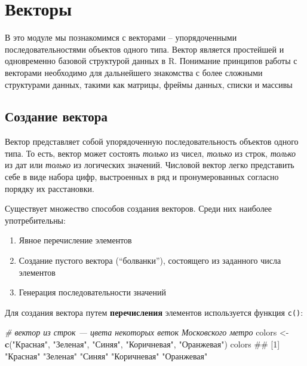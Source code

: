 \documentclass[]{book}
\newenvironment{Shaded}{\begin{snugshade}}{\end{snugshade}}
\newcommand{\KeywordTok}[1]{\textcolor[rgb]{0.13,0.29,0.53}{\textbf{#1}}}
\newcommand{\StringTok}[1]{\textcolor[rgb]{0.31,0.60,0.02}{#1}}
\newcommand{\CommentTok}[1]{\textcolor[rgb]{0.56,0.35,0.01}{\textit{#1}}}
\newcommand{\NormalTok}[1]{#1}
\providecommand{\tightlist}{%
  \setlength{\itemsep}{0pt}\setlength{\parskip}{0pt}}
\begin{document}
\chapter{Векторы}\label{vectors}

В это модуле мы познакомимся с векторами -- упорядоченными
последовательностями объектов одного типа. Вектор является простейшей и
одновременно базовой структурой данных в R. Понимание принципов работы с
векторами необходимо для дальнейшего знакомства с более сложными
структурами данных, такими как матрицы, фреймы данных, списки и массивы

\section{Создание вектора}\label{vector_creation}

Вектор представляет собой упорядоченную последовательность объектов
одного типа. То есть, вектор может состоять \emph{только} из чисел,
\emph{только} из строк, \emph{только} из дат или \emph{только} из
логических значений. Числовой вектор легко представить себе в виде
набора цифр, выстроенных в ряд и пронумерованных согласно порядку их
расстановки.

Существует множество способов создания векторов. Среди них наиболее
употребительны:

\begin{enumerate}
\def\labelenumi{\arabic{enumi}.}
\tightlist
\item
  Явное перечисление элементов
\item
  Создание пустого вектора (``болванки''), состоящего из заданного числа
  элементов
\item
  Генерация последовательности значений
\end{enumerate}

Для создания вектора путем \textbf{перечисления} элементов используется
функция \texttt{c()}:

\begin{Shaded}
\begin{Highlighting}[]
\CommentTok{# вектор из строк — цвета некоторых веток Московского метро}
\NormalTok{colors <-}\StringTok{ }\KeywordTok{c}\NormalTok{(}\StringTok{"Красная"}\NormalTok{, }\StringTok{"Зеленая"}\NormalTok{, }\StringTok{"Синяя"}\NormalTok{, }\StringTok{"Коричневая"}\NormalTok{, }\StringTok{"Оранжевая"}\NormalTok{)}
\NormalTok{colors}
\NormalTok{## [1] "Красная"    "Зеленая"    "Синяя"      "Коричневая" "Оранжевая"}
\end{Highlighting}
\end{Shaded}
\end{document}
